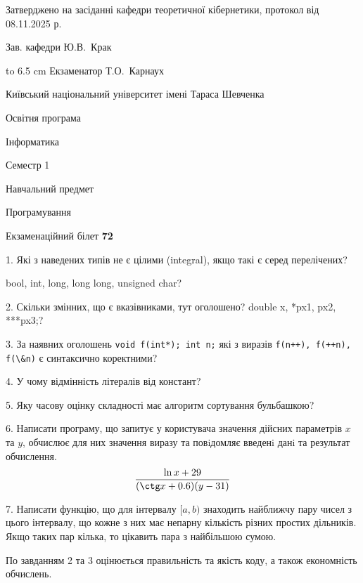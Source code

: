 \documentclass[12pt, ukrainian]{article}
\def\code#1{\Verb!#1!}
\begin{document}
{\smallskip\smallskip \begin {scriptsize} Затверджено на засіданні кафедри теоретичної кібернетики, протокол   від   08.11.2025 р.\par\smallskip\smallskip\smallskip\smallskip
{\parbox {6.5 cm} {Зав. кафедри \dotfill Ю.В.~Крак}}\hspace {0.7cm} {\hbox to 6.5 cm { Екзаменатор \dotfill Т.О.~Карнаух}} \end{scriptsize}}
\vspace{0.9cm}
{{\begin {scriptsize}\par
{ \center  Київський національний університет імені Тараса Шевченка \par}
{\parbox {5 cm}{Освітня програма \hfill}{\parbox {7 cm}{Інформатика\hfill}}\parbox {6 cm}{\hfill Семестр 1}}\par
{\parbox {5 cm} {Навчальний предмет \hfill}\parbox {7 cm}{Програмування \hfill}\parbox {6cm}{\hfill}\par}\vspace{-15pt} \end{scriptsize}}{\center Екзаменаційний білет \No \textbf { 72 }\par}}
{%
1. Які з наведених типів не є цілими (integral), якщо такі є серед перелічених?

bool, int, long, long long, unsigned char?
\par
\vspace{2mm}
2. Скільки змінних, що є вказівниками, тут оголошено?
double x, *px1, px2, ***px3;?
\par
\vspace{2mm}
3. За наявних оголошень \code{void f(int*); int n;} які з виразів \code{f(n++), f(++n), f(\&n)} є синтаксично коректними?
\par
\vspace{2mm}
4. У чому відмінність літералів від констант?
\par
\vspace{2mm}
5. Яку часову оцінку складності має алгоритм сортування бульбашкою?
\par
\vspace{2mm}
6. Написати програму, що запитує у користувача значення дійсних параметрів $x$ та $y$, обчислює для них значення виразу та повiдомляє введенi данi та результат обчислення.
$$\frac{\ln x + 29}{(\ctg x + 0.6) (y - 31)}$$ 

\par
7. Написати функцію, що для інтервалу $[a, b)$ знаходить найближчу пару чисел з цього інтервалу, що кожне з них має непарну кількість різних простих дільників. Якщо таких пар кілька, то цікавить пара з найбільшою сумою.

По завданням 2 та 3 оцінюється правильність та якість коду, а також економність обчислень.

}
\end{document}
